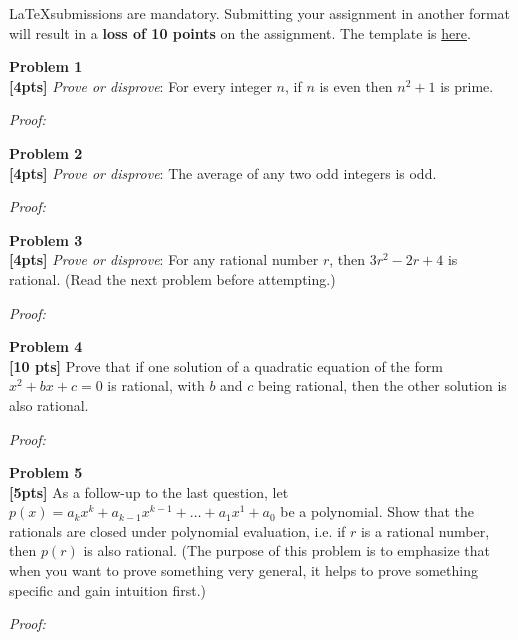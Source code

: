 \documentclass{article}
\newenvironment{problem}[2][Problem]
    { \begin{mdframed}[backgroundcolor=gray!20] \textbf{#1 #2} \\}
    {  \end{mdframed}}
\newenvironment{solution}
    {\textit{Proof:}}
    {}
\begin{document}
\begin{mdframed}[backgroundcolor=blue!20]
\LaTeX submissions are mandatory. Submitting your assignment in another format will result in a \textbf{loss of 10 points} on the assignment. The template is \href{https://www.overleaf.com/9536536597vdfbvpjnykvw}{here}.
\end{mdframed}

\begin{problem}{1}
\textbf{[4pts]} \textit{Prove or disprove}: For every integer $n$, if $n$ is even then $n^2 + 1$ is prime. 
\end{problem}
\begin{solution}
\end{solution}

\begin{problem}{2}
\textbf{[4pts]} \textit{Prove or disprove}: The average of any two odd integers is odd. 
\end{problem}
\begin{solution}
\end{solution}

\begin{problem}{3}
\textbf{[4pts]} \textit{Prove or disprove}: For any rational number $r$, then $3r^2 - 2r + 4$ is rational. (Read the next problem before attempting.)
\end{problem}
\begin{solution}
\end{solution}

\begin{problem}{4}
\textbf{[10 pts]} Prove that if one solution of a quadratic equation of the form $x^2 + bx + c = 0$ is rational, with $b$ and $c$ being rational, then the other solution is also rational.
\end{problem}
\begin{solution}
\end{solution}

\begin{problem}{5}
\textbf{[5pts]} As a follow-up to the last question, let $p(x) = a_k x^k + a_{k-1} x^{k-1} + \ldots + a_1 x^1 + a_0$ be a polynomial. Show that the rationals are closed under polynomial evaluation, i.e. if $r$ is a rational number, then $p(r)$ is also rational. (The purpose of this problem is to emphasize that when you want to prove something very general, it helps to prove something specific and gain intuition first.)
\end{problem}
\begin{solution}
\end{solution}
\end{document}
